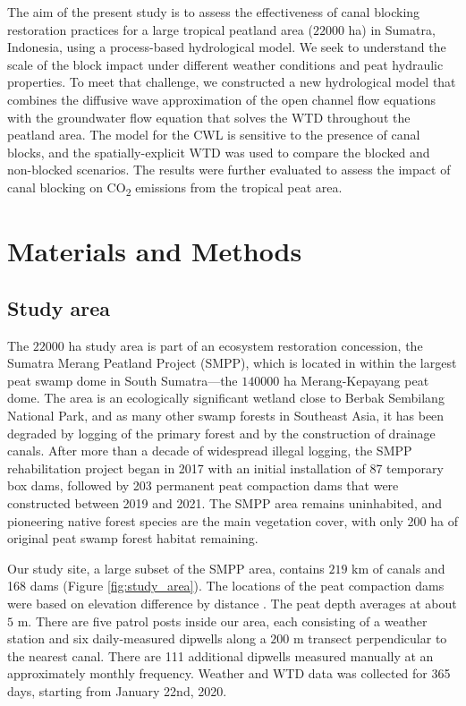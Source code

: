 \documentclass[bg, manuscript]{copernicus}
\begin{document}
The aim of the present study is to assess the effectiveness of canal blocking restoration practices for a large tropical peatland area ($22000$ \unit{ha}) in Sumatra, Indonesia, using a process-based hydrological model.
We seek to understand the scale of the block impact under different weather conditions and  peat hydraulic properties.
To meet that challenge, we constructed a new hydrological model that combines the diffusive wave approximation of the open channel flow equations with the groundwater flow equation that solves the WTD throughout the peatland area.
The model for the CWL is sensitive to the presence of canal blocks, and the spatially-explicit WTD was used to compare the blocked and non-blocked scenarios.
The results were further evaluated to assess the impact of canal blocking on CO\textsubscript{2} emissions from the tropical peat area.


\section{Materials and Methods}
\subsection{Study area}
The $22000$ \unit{ha} study area is part of an ecosystem restoration concession, the Sumatra Merang Peatland Project (SMPP), which is located in within the largest peat swamp dome in South Sumatra---the $140000$ \unit{ha} Merang-Kepayang peat dome.
The area is an ecologically significant wetland close to Berbak Sembilang National Park, and as many other swamp forests in Southeast Asia, it has been degraded by logging of the primary forest and by the construction of drainage canals.
After more than a decade of widespread illegal logging, the SMPP rehabilitation project  began in 2017 with an initial installation of 87 temporary box dams, followed by 203 permanent peat compaction dams that were constructed between 2019 and 2021.
The SMPP area remains uninhabited, and pioneering native forest species are the main vegetation cover, with only 200 ha of original peat swamp forest habitat remaining.

Our study site, a large subset of the SMPP area, contains  $219$ \unit{km} of canals and 168 dams (Figure \ref{fig:study_area}).
The locations of the peat compaction dams  were based on elevation difference by distance \citep{jaenickePlanningHydrologicalRestoration2010}.
The peat depth averages at about $5$ \unit{m}.
There are five patrol posts inside our area, each consisting of a weather station and six daily-measured dipwells along a $200$ \unit{m} transect perpendicular to the nearest canal. 
There are 111 additional dipwells measured manually at an approximately monthly frequency.
Weather and WTD data was collected for 365 days, starting from January 22nd, 2020.
\end{document}
